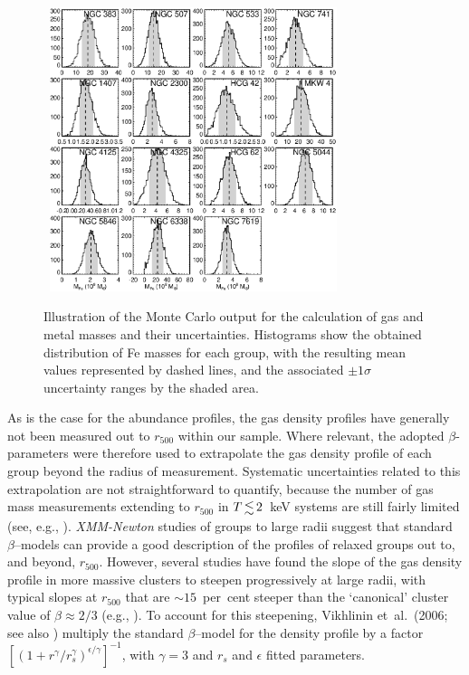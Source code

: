 \documentclass[useAMS,usenatbib]{mn2e}
\begin{document}
\begin{figure} 
\mbox{\hspace{-1mm} 
 \includegraphics[width=84mm]{fig2.eps}} 
\caption{Illustration of the Monte Carlo output for the calculation of
  gas and metal masses and their uncertainties.  Histograms show the
  obtained distribution of Fe masses for each group, with the
  resulting mean values represented by dashed lines, and the
  associated $\pm 1\sigma$ uncertainty ranges by the shaded area.}
\label{fig,histo} 
\end{figure} 

As is the case for the abundance profiles, the gas density profiles
have generally not been measured out to $r_{500}$ within our
sample. Where relevant, the adopted $\beta$-parameters were therefore
used to extrapolate the gas density profile of each group beyond the
radius of measurement. Systematic uncertainties related to this
extrapolation are not straightforward to quantify, because the number
of gas mass measurements extending to $r_{500}$ in $T\la 2$~keV
systems are still fairly limited (see, e.g., \citealt{sun09}). {\em
XMM-Newton} studies of groups to large radii \citep{rasm04} suggest
that standard $\beta$--models can provide a good description of the
profiles of relaxed groups out to, and beyond, $r_{500}$.  However,
several studies have found the slope of the gas density profile in
more massive clusters to steepen progressively at large radii, with
typical slopes at $r_{500}$ that are $\sim 15$~per~cent steeper than
the `canonical' cluster value of $\beta \approx 2/3$ (e.g.,
\citealt{vikh06,maug08}). To account for this steepening, Vikhlinin
et~al.\ (2006; see also \citealt{sun09}) multiply the standard
$\beta$--model for the density profile by a factor
$[(1+r^{\gamma}/r_s^{\gamma})^{\epsilon/\gamma}]^{-1}$, with
$\gamma=3$ and $r_s$ and $\epsilon$ fitted parameters.
\end{document}
